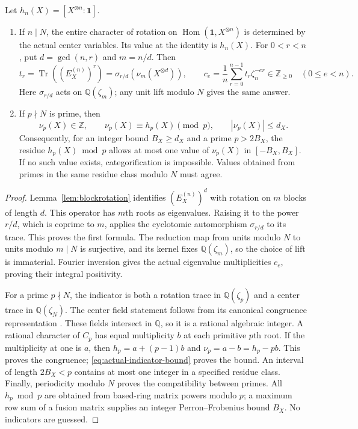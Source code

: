 \begin{proposition}
\label{prop:actual-rotation-prime}
Let $h_n(X)=[X^{\otimes n}:\mathbf1]$.
\begin{enumerate}
\item If $n\mid N$, the entire character of rotation on
$\operatorname{Hom}(\mathbf1,X^{\otimes n})$ is determined by the actual
center variables. Its value at the identity is $h_n(X)$. For
$0<r<n$, put $d=\gcd(n,r)$ and $m=n/d$. Then
\begin{equation}\label{eq:full-rotation-character}
 t_r=\operatorname{Tr}((E_X^{(n)})^r)
     =\sigma_{r/d}\!\left(\nu_m(X^{\otimes d})\right),
 \qquad
 c_e=\frac1n\sum_{r=0}^{n-1}t_r\zeta_n^{-er}
       \in\mathbb Z_{\ge0}\quad(0\le e<n).
\end{equation}
Here $\sigma_{r/d}$ acts on $\mathbb Q(\zeta_m)$; any unit lift modulo
$N$ gives the same answer.
\item If $p\nmid N$ is prime, then
\begin{equation}\label{eq:prime-indicator-congruence}
 \nu_p(X)\in\mathbb Z,\qquad
 \nu_p(X)\equiv h_p(X)\pmod p,\qquad |\nu_p(X)|\le d_X.
\end{equation}
Consequently, for an integer bound $B_X\ge d_X$ and a prime
$p>2B_X$, the residue $h_p(X)\bmod p$ allows at most one value of
$\nu_p(X)$ in $[-B_X,B_X]$. If no such value exists, categorification
is impossible. Values obtained from primes in the same residue class
modulo $N$ must agree.
\end{enumerate}
\end{proposition}
\begin{proof}
Lemma~\ref{lem:blockrotation} identifies $(E_X^{(n)})^d$ with rotation
on $m$ blocks of length $d$. This operator has $m$th roots as eigenvalues.
Raising it to the power $r/d$, which is coprime to $m$, applies the
cyclotomic automorphism $\sigma_{r/d}$ to its trace. This proves the
first formula. The reduction map from units modulo $N$ to units modulo
$m\mid N$ is surjective, and its kernel fixes $\mathbb Q(\zeta_m)$,
so the choice of lift is immaterial. Fourier inversion gives the actual
eigenvalue multiplicities $c_e$, proving their integral positivity.

For a prime $p\nmid N$, the indicator is both a rotation trace in
$\mathbb Q(\zeta_p)$ and a center trace in $\mathbb Q(\zeta_N)$.
The center field statement follows from its canonical congruence
representation \cite[Theorem~II]{DLN}. These fields intersect in
$\mathbb Q$, so it is a rational algebraic integer. A rational character of $C_p$ has equal multiplicity $b$ at
each primitive $p$th root. If the multiplicity at one is $a$, then
$h_p=a+(p-1)b$ and $\nu_p=a-b=h_p-pb$. This proves the congruence;
\eqref{eq:actual-indicator-bound} proves the bound. An interval of
length $2B_X<p$ contains at most one integer in a specified residue
class. Finally, periodicity modulo $N$ proves the compatibility between
primes. All $h_p\bmod p$ are obtained from based-ring matrix powers
modulo $p$; a maximum row sum of a fusion matrix supplies an integer
Perron--Frobenius bound $B_X$. No indicators are guessed.
\end{proof}

